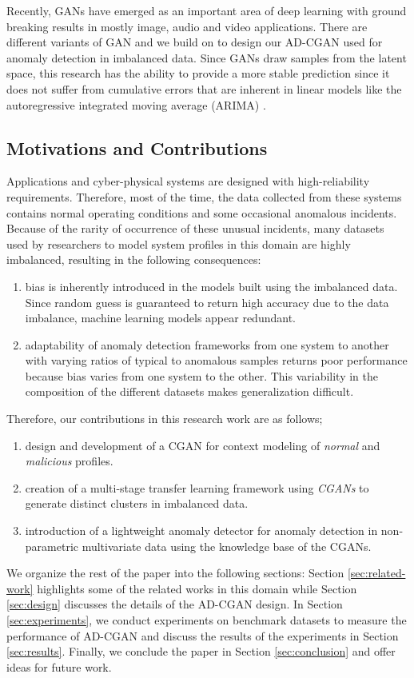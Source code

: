 Recently, GANs \cite{goodfellow2014generative} have emerged as an important area of deep learning with ground breaking results in mostly image, audio and video applications. There are different variants of GAN \cite{wang2019generative} and we build on \cite{mirza2014conditional} to design our AD-CGAN used for anomaly detection in imbalanced data. Since GANs draw samples from the latent space, this research has the ability to provide a more stable prediction since it does not suffer from cumulative errors that are inherent in linear models like the autoregressive integrated moving average (ARIMA) \cite{zhang2003time}.
 

\subsection{Motivations and Contributions}
\label{subsec:time-event}
Applications and cyber-physical systems are designed with high-reliability requirements. Therefore, most of the time, the data collected from these systems contains normal operating conditions and some occasional anomalous incidents. Because of the rarity of occurrence of these unusual incidents, many datasets used by researchers to model system profiles in this domain are highly imbalanced, resulting in the following consequences: 
\begin{enumerate}[label={\alph*)},font={\bfseries}]
	\item bias is inherently introduced in the models built using the imbalanced data. Since random guess is guaranteed to return high accuracy due to the data imbalance, machine learning models appear redundant.
	\item adaptability of anomaly detection frameworks from one system to another with varying ratios of typical to anomalous samples returns poor performance because bias varies from one system to the other. This variability in the composition of the different datasets makes generalization difficult.
\end{enumerate}
Therefore, our contributions in this research work are as follows;
\begin{enumerate}[label={\alph*)},font={\bfseries}]
    \item design and development of a CGAN for context modeling of \textit{normal} and \textit{malicious} profiles.
	\item creation of a multi-stage transfer learning framework using \textit{CGANs} to generate distinct clusters in imbalanced data. 
	\item introduction of a lightweight anomaly detector for anomaly detection in non-parametric multivariate data using the knowledge base of the CGANs.
\end{enumerate}
We organize the rest of the paper into the following sections: Section \ref{sec:related-work} highlights some of the related works in this domain while Section \ref{sec:design} discusses the details of the AD-CGAN design. In Section \ref{sec:experiments}, we conduct experiments on benchmark datasets to measure the performance of AD-CGAN and discuss the results of the experiments in Section \ref{sec:results}. Finally, we conclude the paper in Section \ref{sec:conclusion} and offer ideas for future work.
